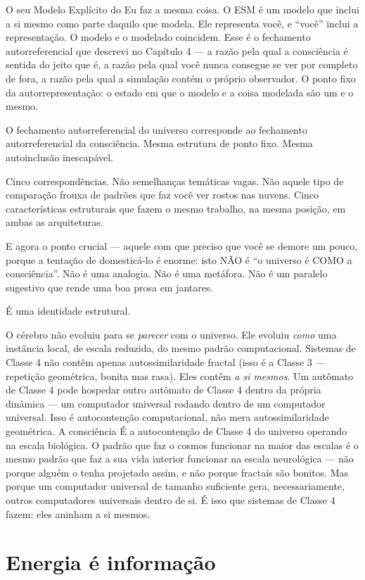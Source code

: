 \documentclass[11pt, twoside, openright]{book}
\begin{document}
O seu Modelo Explícito do Eu faz a mesma coisa. O ESM é um modelo que inclui a si mesmo como parte daquilo que modela. Ele representa você, e ``você'' inclui a representação. O modelo e o modelado coincidem. Esse é o fechamento autorreferencial que descrevi no Capítulo 4 --- a razão pela qual a consciência é sentida do jeito que é, a razão pela qual você nunca consegue se ver por completo de fora, a razão pela qual a simulação contém o próprio observador. O ponto fixo da autorrepresentação: o estado em que o modelo e a coisa modelada são um e o mesmo.

O fechamento autorreferencial do universo corresponde ao fechamento autorreferencial da consciência. Mesma estrutura de ponto fixo. Mesma autoinclusão inescapável.

Cinco correspondências. Não semelhanças temáticas vagas. Não aquele tipo de comparação frouxa de padrões que faz você ver rostos nas nuvens. Cinco características estruturais que fazem o mesmo trabalho, na mesma posição, em ambas as arquiteturas.

E agora o ponto crucial --- aquele com que preciso que você se demore um pouco, porque a tentação de domesticá-lo é enorme: isto NÃO é ``o universo é COMO a consciência''. Não é uma analogia. Não é uma metáfora. Não é um paralelo sugestivo que rende uma boa prosa em jantares.

É uma identidade estrutural.

O cérebro não evoluiu para se \textit{parecer} com o universo. Ele evoluiu \textit{como} uma instância local, de escala reduzida, do mesmo padrão computacional. Sistemas de Classe 4 não contêm apenas autossimilaridade fractal (isso é a Classe 3 --- repetição geométrica, bonita mas rasa). Eles contêm \textit{a si mesmos}. Um autômato de Classe 4 pode hospedar outro autômato de Classe 4 dentro da própria dinâmica --- um computador universal rodando dentro de um computador universal. Isso é autocontenção computacional, não mera autossimilaridade geométrica. A consciência É a autocontenção de Classe 4 do universo operando na escala biológica. O padrão que faz o cosmos funcionar na maior das escalas é o mesmo padrão que faz a sua vida interior funcionar na escala neurológica --- não porque alguém o tenha projetado assim, e não porque fractais são bonitos. Mas porque um computador universal de tamanho suficiente gera, necessariamente, outros computadores universais dentro de si. É isso que sistemas de Classe 4 fazem: eles aninham a si mesmos.

\section*{Energia é informação}
\end{document}
